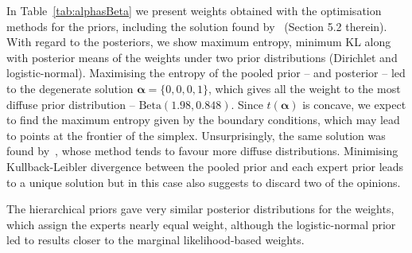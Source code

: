 \documentclass[a4paper, notitlepage, 11pt]{article}
\begin{document}
In Table~\ref{tab:alphasBeta} we present weights obtained with the optimisation methods for the priors, including the solution found by~\cite{Rufo2012B} (Section 5.2 therein).
With regard to the posteriors, we show maximum entropy, minimum KL along with posterior means of the weights under two prior distributions (Dirichlet and logistic-normal).
Maximising the entropy of the pooled prior -- and posterior -- led to the degenerate solution $\boldsymbol \alpha = \{0, 0, 0, 1 \}$, which gives all the weight to the most diffuse prior distribution -- $\text{Beta}(1.98, 0.848)$.
Since $t(\boldsymbol\alpha)$ is concave, we expect to find the maximum entropy given by the boundary conditions, which may lead to points at the frontier of the simplex.
Unsurprisingly, the same solution was found by~\cite{Rufo2012B}, whose method tends to favour more diffuse distributions.
Minimising Kullback-Leibler divergence between the pooled prior and each expert prior leads to a unique solution but in this case also suggests to discard two of the opinions.

The hierarchical priors gave very similar posterior distributions for the weights, which assign the experts nearly equal weight, although the logistic-normal prior led to results closer to the marginal likelihood-based weights.
\end{document}
